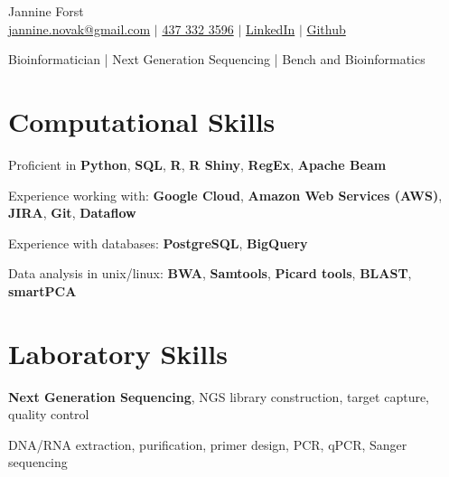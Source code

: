 \documentclass[11pt]{article}
\begin{document}
\begin{center}
    {\fontsize{36}{36}\selectfont\intermedium Jannine Forst} \\ \bigskip
    {\color{icnclr}\faEnvelope[regular]} \href{mailto:jannine.novak@gmail.com}{jannine.novak@gmail.com} $|$ 
    {\color{icnclr}} \href{tel:1234567890}{437 332 3596} $|$
    \href{https://www.linkedin.com/in/jannine-forst/}{\color{icnclr}\faLinkedin} 
    \href{https://www.linkedin.com/in/jannine-forst/} {LinkedIn} $|$
    \href{https://github.com/jannine-forst}
    {\color{icnclr}\faGithub} \href{https://github.com/jannine-forst} {Github}
    

    \item{Bioinformatician | Next Generation Sequencing | Bench and Bioinformatics}
\end{center}

\section{Computational Skills}
\begin{description}
    \item Proficient in \textbf{Python}, \textbf{SQL}, \textbf{R}, \textbf{R Shiny}, \textbf{RegEx}, \textbf{Apache Beam}
    \item Experience working with: \textbf{Google Cloud}, \textbf{Amazon Web Services (AWS)}, \textbf{JIRA}, \textbf{Git}, \textbf{Dataflow}
    \item Experience with databases: \textbf{PostgreSQL}, \textbf{BigQuery}
    \item Data analysis in unix/linux: \textbf{BWA}, \textbf{Samtools}, \textbf{Picard tools}, \textbf{BLAST}, \textbf{smartPCA}
\end{description}

\section{Laboratory Skills}
\begin{description}
    \item \textbf{Next Generation Sequencing}, NGS library construction, target capture, quality control
    \item DNA/RNA extraction, purification, primer design, PCR, qPCR, Sanger sequencing
\end{description}
\end{document}
